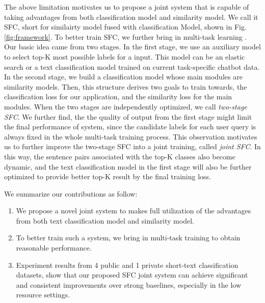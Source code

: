 \documentclass[letterpaper]{article} %
\begin{document}
  The  above limitation motivates us to propose a joint system that is capable of
  taking  advantages  from  both  classification model and similarity model. We
  call  it  SFC,  short  for  similairty model fused with classification Model,
  shown  in  Fig.  \ref{fig:framework}.  To  better train SFC, we further bring in
  multi-task   learning   \cite{caruana1993multitask,collobert2008unified, liu2019multi}.  Our
  basic  idea  came  from  two  stages. In the first stage, we use an auxiliary
  model  to  select top-K most possible labels for a input. This model can be an
  elastic search  \cite{divya2013elasticsearch}  or  a  text classification model
  trained on current task-specific chatbot data. In the second stage, we build a
  classification  model  whose  main modules are similarity models. Then, this
  structure  derives two goals to train towards, the classification loss for our
  application,  and the similarity loss for the main modules. When the two stages
  are  independently  optimized,  we call \emph{two-stage SFC}. We further find,
  the  the  quality  of  output  from  the  first  stage  might  limit the final
  performance  of  system,  since  the  candidate  labels for each user query is
  always  fixed  in  the  whole  multi-task  training  process. This observation
  motivates  us  to  further  improve  the  two-stage SFC into a joint training,
  called  \emph{joint  SFC}. In this way, the sentence pairs associated with the
  top-K  classes  also  become dynamic, and the text classification model in the
  first  stage  will also be further optimized to provide better top-K result by
  the final training loss.


  We summarize our contributions as follow:
  \begin{enumerate}
    \item We propose a novel joint system to makes full utilization of
    the advantages from both text classification model and similarity model.

    \item To  better  train such a system, we bring in multi-task training to obtain
    reasonable performance.

    \item Experiment  results  from 4 public and 1 private short-text classification
    datasets,  show  that  our  proposed  SFC joint system can achieve significant
    and consistent improvements over strong baselines, especially in the low resource settings.
  \end{enumerate}
\end{document}
